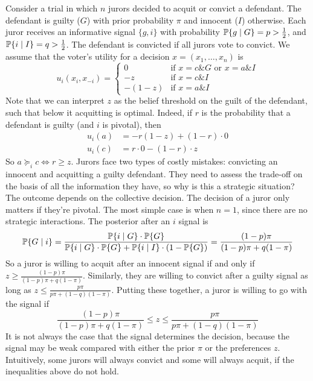 \documentclass[10pt]{article}
\begin{document}
\begin{example}
	 Consider a trial in which $n$ jurors decided to acquit or convict a defendant. The defendant is guilty ($G$) with prior probability $\pi$ and innocent ($I$) otherwise. Each juror receives an informative signal $\{g,i\}$ with probability $\mathbb{P}\{g \mid G\} =p > \frac{1}{2}$, and $\mathbb{P}\{i \mid I\} = q > \frac{1}{2}$. The defendant is convicted if all jurors vote to convict. We assume that the voter's utility for a decision $x = (x_1,\dots,x_n)$ is\[u_i(x_i,x_{-i}) = \begin{cases} 0 & \text{if } x = c \& G \text{ or } x = a \& I \\ -z & \text{if } x = c \& I \\ -(1-z) & \text{if } x = a \& I\end{cases}\]Note that we can interpret $z$ as the belief threshold on the guilt of the defendant, such that below it acquitting is optimal. Indeed, if $r$ is the probability that a defendant is guilty (and $i$ is pivotal), then \begin{align*} u_i(a) &= -r(1-z) + (1-r) \cdot 0 \\ u_i(c) &= r \cdot 0 - (1-r)\cdot z\end{align*}So $a \succeq_i c \iff r \ge z$. Jurors face two types of costly mistakes: convicting an innocent and acquitting a guilty defendant. They need to assess the trade-off on the basis of all the information they have, so why is this a strategic situation? The outcome depends on the collective decision. The decision of a juror only matters if they're pivotal. The most simple case is when $n = 1$, since there are no strategic interactions. The posterior after an $i$ signal is \[\mathbb{P}\{G \mid i\} = \frac{\mathbb{P}\{i\mid G\} \cdot \mathbb{P}\{G\}}{\mathbb{P}\{i \mid G\}\cdot \mathbb{P}\{G\} + \mathbb{P}\{i \mid I \}\cdot (1-\mathbb{P}\{G\})} = \frac{(1-p)\pi}{(1-p)\pi + q(1-\pi)}\]So a juror is willing to acquit after an innocent signal if and only if $z \ge \frac{(1-p)\pi}{(1-p)\pi + q(1-\pi)}$. Similarly, they are willing to convict after a guilty signal as long as $z \le \frac{p\pi}{p\pi +(1-q)(1-\pi)}$. Putting these together, a juror is willing to go with the signal if \[\frac{(1-p)\pi}{(1-p)\pi + q(1-\pi)} \le z \le \frac{p\pi}{p\pi +(1-q)(1-\pi)}\]It is not always the case that the signal determines the decision, because the signal may be weak compared with either the prior $\pi$ or the preferences $z$. Intuitively, some jurors will always convict and some will always acquit, if the inequalities above do not hold.
	

\end{example}
\end{document}
